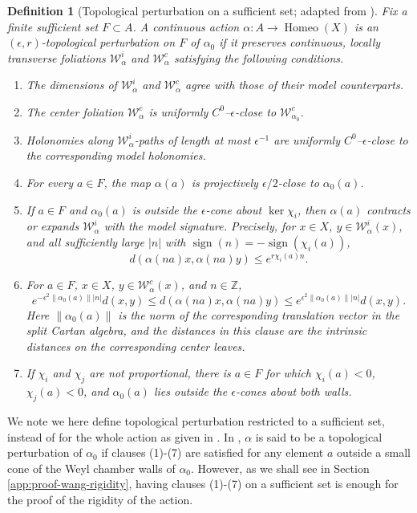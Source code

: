 \documentclass[11pt]{amsart}
\numberwithin{equation}{section}
\theoremstyle{plain}
\newtheorem{defi}{Definition}[section]
\begin{document}
\begin{defi}[Topological perturbation on a sufficient set; adapted from
{\cite[Definition~5.1]{Wang26}}]
\label{def:topological-perturbation}
Fix a finite sufficient set $F\subset A$.  A
continuous action $\alpha:A\to\operatorname{Homeo}(X)$ is an
$(\epsilon,r)$-\emph{topological perturbation on $F$} of
$\alpha_0$ if it
preserves continuous, locally transverse foliations
$\mathcal W^i_\alpha$ and $\mathcal W^c_\alpha$ satisfying the following
conditions.
\begin{enumerate}
\item The dimensions of $\mathcal W^i_\alpha$ and
$\mathcal W^c_\alpha$ agree with those of their model counterparts.

\item The center foliation $\mathcal W^c_\alpha$ is uniformly
$C^0$--$\epsilon$-close to $\mathcal W^c_{\alpha_0}$.

\item Holonomies along $\mathcal W^i_\alpha$-paths of length at most
$\epsilon^{-1}$ are uniformly $C^0$--$\epsilon$-close to the
corresponding model holonomies.

\item For every $a\in F$, the map $\alpha(a)$ is projectively
$\epsilon/2$-close to $\alpha_0(a)$.

\item If $a\in F$ and $\alpha_0(a)$ is outside the $\epsilon$-cone about
$\ker\chi_i$, then $\alpha(a)$ contracts or expands
$\mathcal W^i_\alpha$ with the model signature.  Precisely, for
$x\in X$, $y\in\mathcal W^i_\alpha(x)$, and all sufficiently large
$|n|$ with
$\operatorname{sign}(n)=-\operatorname{sign}(\chi_i(a))$,
\[
d(\alpha(na)x,\alpha(na)y)\le e^{r\chi_i(a)n}.
\]

\item For $a\in F$, $x\in X$, $y\in\mathcal W^c_\alpha(x)$, and
$n\in\mathbb Z$,
\[
e^{-\epsilon^2\|\alpha_0(a)\||n|}d(x,y)
\le d(\alpha(na)x,\alpha(na)y)
\le e^{\epsilon^2\|\alpha_0(a)\||n|}d(x,y).
\]
Here $\|\alpha_0(a)\|$ is the norm of the corresponding translation
vector in the split Cartan algebra, and the distances in this clause are
the intrinsic distances on the corresponding center leaves.

\item If $\chi_i$ and $\chi_j$ are not proportional, there is
$a\in F$ for which $\chi_i(a)<0$, $\chi_j(a)<0$, and
$\alpha_0(a)$ lies outside the $\epsilon$-cones about both walls.
\end{enumerate}
\end{defi}
We note we here define topological perturbation restricted to a sufficient set, instead of for the whole action as given in \cite{Wang26}. In {\cite[Definition~5.1]{Wang26}}, $\alpha$ is said to be a topological perturbation of $\alpha_0$ if clauses (1)-(7) are satisfied for any element $a$ outside a small cone of the Weyl chamber walls of $\alpha_0$. However, as we shall see in Section \ref{app:proof-wang-rigidity}, having clauses (1)-(7) on a sufficient set is enough for the proof of the rigidity of the action.
\end{document}

